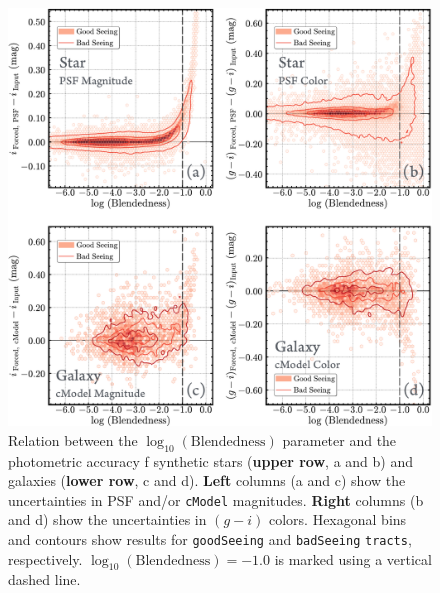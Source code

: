 \documentclass[useamsfonts]{pasj01}
\def\cmodel{\texttt{cModel}}
\def\tracts{\texttt{tracts}}
\begin{document}
\begin{figure}
    \begin{center}
        \includegraphics[width=\textwidth]{fig/synpipe_blendedness_err}
    \end{center}
    \caption{
        Relation between the $\log_{10} (\mathrm{Blendedness})$ parameter
        and the photometric accuracy f synthetic stars (\textbf{upper row}, a and 
        b) and galaxies (\textbf{lower row}, c and d).
        \textbf{Left} columns (a and c) show the uncertainties in PSF and/or \cmodel{} 
        magnitudes. \textbf{Right} columns (b and d) show the uncertainties in 
        $(g-i)$ colors.
        Hexagonal bins and contours show results for \texttt{goodSeeing} and
        \texttt{badSeeing} \tracts{}, respectively.
        $\log_{10} (\mathrm{Blendedness}) = -1.0$ is marked using a vertical dashed 
        line.
        }
    \label{fig:blend}
\end{figure}
\end{document}
